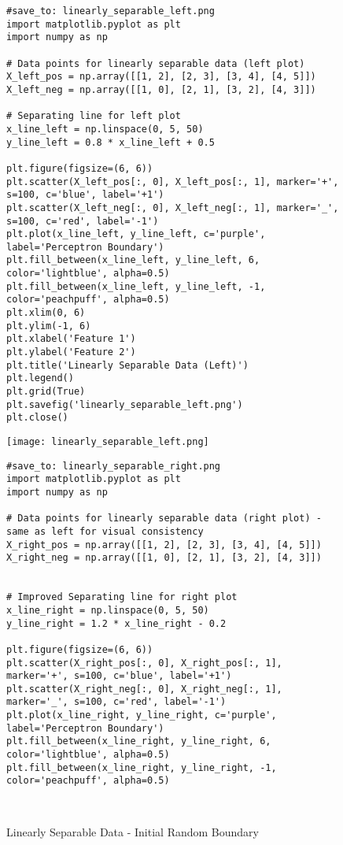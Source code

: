 \documentclass{article}
\begin{document}
\begin{figure}[H]
    \centering
    \begin{minipage}{0.45\textwidth}
        \centering
        \begin{verbatim}
#save_to: linearly_separable_left.png
import matplotlib.pyplot as plt
import numpy as np

# Data points for linearly separable data (left plot)
X_left_pos = np.array([[1, 2], [2, 3], [3, 4], [4, 5]])
X_left_neg = np.array([[1, 0], [2, 1], [3, 2], [4, 3]])

# Separating line for left plot
x_line_left = np.linspace(0, 5, 50)
y_line_left = 0.8 * x_line_left + 0.5

plt.figure(figsize=(6, 6))
plt.scatter(X_left_pos[:, 0], X_left_pos[:, 1], marker='+', s=100, c='blue', label='+1')
plt.scatter(X_left_neg[:, 0], X_left_neg[:, 1], marker='_', s=100, c='red', label='-1')
plt.plot(x_line_left, y_line_left, c='purple', label='Perceptron Boundary')
plt.fill_between(x_line_left, y_line_left, 6, color='lightblue', alpha=0.5)
plt.fill_between(x_line_left, y_line_left, -1, color='peachpuff', alpha=0.5)
plt.xlim(0, 6)
plt.ylim(-1, 6)
plt.xlabel('Feature 1')
plt.ylabel('Feature 2')
plt.title('Linearly Separable Data (Left)')
plt.legend()
plt.grid(True)
plt.savefig('linearly_separable_left.png')
plt.close()
        \end{verbatim}
         \texttt{[image: linearly\_separable\_left.png]}
        \caption{Linearly Separable Data - Initial Random Boundary}
        \label{fig:linearly_separable_left}
    \end{minipage}
    \hfill
    \begin{minipage}{0.45\textwidth}
        \centering
        \begin{verbatim}
#save_to: linearly_separable_right.png
import matplotlib.pyplot as plt
import numpy as np

# Data points for linearly separable data (right plot) - same as left for visual consistency
X_right_pos = np.array([[1, 2], [2, 3], [3, 4], [4, 5]])
X_right_neg = np.array([[1, 0], [2, 1], [3, 2], [4, 3]])


# Improved Separating line for right plot
x_line_right = np.linspace(0, 5, 50)
y_line_right = 1.2 * x_line_right - 0.2

plt.figure(figsize=(6, 6))
plt.scatter(X_right_pos[:, 0], X_right_pos[:, 1], marker='+', s=100, c='blue', label='+1')
plt.scatter(X_right_neg[:, 0], X_right_neg[:, 1], marker='_', s=100, c='red', label='-1')
plt.plot(x_line_right, y_line_right, c='purple', label='Perceptron Boundary')
plt.fill_between(x_line_right, y_line_right, 6, color='lightblue', alpha=0.5)
plt.fill_between(x_line_right, y_line_right, -1, color='peachpuff', alpha=0.5)



\end{verbatim}
\end{minipage}
\end{figure}
\end{document}
